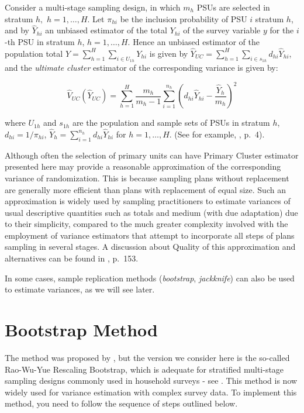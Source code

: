 \documentclass[
  12pt,
]{book}
\begin{document}
Consider a multi-stage sampling design, in which \(m_{h}\) PSUs are selected in stratum \(h,\) \(h=1,\ldots ,H\). Let \(\pi_{hi}\) be the inclusion probability of PSU \(i\) stratum \(h\), and by \(\widehat{Y}_{hi}\) an unbiased estimator of the total \(Y_{hi}\) of the survey variable \(y\) for the \(i\)-th PSU in stratum \(h\), \(h=1,\ldots ,H\). Hence an unbiased estimator of the population total \(Y = \sum_{h=1}^{H} \sum_{i \in U_{1h}} Y_{hi}\) is given by \(\widehat{Y}_{UC} = \sum_{h=1}^{H} \sum_{i \in s_{1h}} d_{hi} \widehat{Y}_{hi}\), and the \emph{ultimate cluster} estimator of the corresponding variance is given by:

\[
\widehat{V}_{UC} \left( \widehat{Y}_{UC}\right) = \sum_{h=1}^{H} \frac{m_{h}}
{m_{h}-1} \sum_{i=1}^{n_{h}} \left( d_{hi} \widehat{Y}_{hi} - \frac{\widehat{Y}_{h}}{m_{h}} \right) ^{2}
\]

where \(U_{1h}\) and \(s_{1h}\) are the population and sample sets of PSUs in stratum \(h\), \(d_{hi} = 1 / \pi_{hi}\), \(\widehat{Y}_{h} = \sum_{i=1}^{n_{h}} d_{hi} \widehat{Y}_{hi}\) for \(h=1,\ldots ,H\). (See for example, \citep{Shah1993}, p.~4).

Although often the selection of primary units can have Primary Cluster estimator presented here may provide a reasonable approximation of the corresponding variance of randomization. This is because sampling plans without replacement are generally more efficient than plans with replacement of equal size. Such an approximation is widely used by sampling practitioners to estimate variances of usual descriptive quantities such as totals and medium (with due adaptation) due to their simplicity, compared to the much greater complexity involved with the employment of variance estimators that attempt to incorporate all steps of plans sampling in several stages. A discussion about Quality of this approximation and alternatives can be found in \citep{SSW92}, p.~153.

In some cases, sample replication methods (\emph{bootstrap}, \emph{jackknife}) can also be used to estimate variances, as we will see later.

\hypertarget{bootstrap-method}{%
\section{Bootstrap Method}\label{bootstrap-method}}

The method was proposed by \citet{Efron1979}, but the version we consider here is the so-called Rao-Wu-Yue Rescaling Bootstrap, which is adequate for stratified multi-stage sampling designs commonly used in household surveys - see \citet{Rao1992}. This method is now widely used for variance estimation with complex survey data. To implement this method, you need to follow the sequence of steps outlined below.
\end{document}
